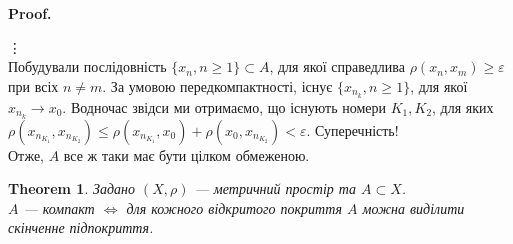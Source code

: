 \documentclass[a4paper, 10pt]{article}
\makeatletter
\theoremstyle{theoremdd}
\newtheorem{theorem}{Theorem}[subsection]
\theoremstyle{theoremdd}
\theoremstyle{theoremdd}
\theoremstyle{theoremdd}
\theoremstyle{theoremdd}
\theoremstyle{theoremdd}
\theoremstyle{theoremdd}
\theoremstyle{theoremdd}
\renewenvironment{proof}[1][Proof.\\]{\par
\pushQED{\hfill \qed}%
\normalfont \topsep6\p@\@plus6\p@\relax
\trivlist
\item\relax
{\bfseries
#1\@addpunct{.}}\hspace\labelsep\ignorespaces
}{%
\popQED\endtrivlist\@endpefalse
}
\makeatother
\begin{document}
\begin{proof}
\vdots \\
Побудували послідовність $\{x_n, n \geq 1\} \subset A$, для якої справедлива $\rho(x_n,x_m) \geq \varepsilon$ при всіх $n \neq m$. За умовою передкомпактності, існує $\{x_{n_k}, n \geq 1\}$, для якої $x_{n_k} \to x_0$. Водночас звідси ми отримаємо, що існують номери $K_1,K_2$, для яких $\rho(x_{n_{K_1}}, x_{n_{K_2}}) \leq \rho(x_{n_{K_1}}, x_0) + \rho(x_0, x_{n_{K_2}}) < \varepsilon$. Суперечність!\\
Отже, $A$ все ж таки має бути цілком обмеженою.
\end{proof}

\begin{theorem}
Задано $(X,\rho)$ --- метричний простір та $A \subset X$.\\
$A$ --- компакт $\iff$ для кожного відкритого покриття $A$ можна виділити скінченне підпокриття.
\end{theorem}
\end{document}
